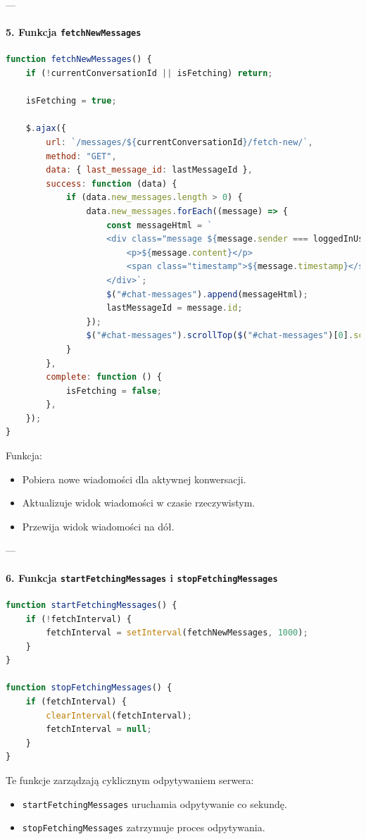 \documentclass[12pt,a4paper,oneside]{article}
\theoremstyle{definition}
\numberwithin{equation}{section}
\begin{document}
---

\paragraph{5. Funkcja \texttt{fetchNewMessages}}
\begin{lstlisting}[language=JavaScript, caption=Funkcja \texttt{fetchNewMessages}]
function fetchNewMessages() {
    if (!currentConversationId || isFetching) return;

    isFetching = true;

    $.ajax({
        url: `/messages/${currentConversationId}/fetch-new/`,
        method: "GET",
        data: { last_message_id: lastMessageId },
        success: function (data) {
            if (data.new_messages.length > 0) {
                data.new_messages.forEach((message) => {
                    const messageHtml = `
                    <div class="message ${message.sender === loggedInUser ? "message-sent" : "message-received"}">
                        <p>${message.content}</p>
                        <span class="timestamp">${message.timestamp}</span>
                    </div>`;
                    $("#chat-messages").append(messageHtml);
                    lastMessageId = message.id;
                });
                $("#chat-messages").scrollTop($("#chat-messages")[0].scrollHeight);
            }
        },
        complete: function () {
            isFetching = false;
        },
    });
}
\end{lstlisting}
Funkcja:
\begin{itemize}
    \item Pobiera nowe wiadomości dla aktywnej konwersacji.
    \item Aktualizuje widok wiadomości w czasie rzeczywistym.
    \item Przewija widok wiadomości na dół.
\end{itemize}

---

\paragraph{6. Funkcja \texttt{startFetchingMessages} i \texttt{stopFetchingMessages}}
\begin{lstlisting}[language=JavaScript, caption=Funkcje do zarządzania cyklicznym odpytywaniem]
function startFetchingMessages() {
    if (!fetchInterval) {
        fetchInterval = setInterval(fetchNewMessages, 1000);
    }
}

function stopFetchingMessages() {
    if (fetchInterval) {
        clearInterval(fetchInterval);
        fetchInterval = null;
    }
}
\end{lstlisting}
Te funkcje zarządzają cyklicznym odpytywaniem serwera:
\begin{itemize}
    \item \texttt{startFetchingMessages} uruchamia odpytywanie co sekundę.
    \item \texttt{stopFetchingMessages} zatrzymuje proces odpytywania.
\end{itemize}
\end{document}
